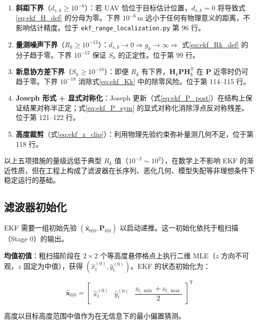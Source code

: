 \begin{enumerate}
    \item \textbf{斜距下界}（$d_{s,k} \ge 10^{-6}$）：若 UAV 恰位于目标估计位置，$d_{s,k} = 0$ 将导致式\eqref{eq:ekf_H_def} 的分母为零。下界 $10^{-6}\,\text{m}$ 远小于任何有物理意义的距离，不影响估计精度。位于 \texttt{ekf\_range\_localization.py} 第 96 行。
    \item \textbf{量测噪声下界}（$R_k \ge 10^{-12}$）：$d_{s,k} \to 0 \Rightarrow g_k \to \infty \Rightarrow$ 式\eqref{eq:ekf_Rk_def} 的分子趋于零。下界 $10^{-12}$ 保证 $S_k$ 的正定性。位于第 99 行。
    \item \textbf{新息协方差下界}（$S_k \ge 10^{-18}$）：即便 $R_k$ 有下界，$\mathbf{H}_k \mathbf{P} \mathbf{H}_k^{\mathsf{T}}$ 在 $\mathbf{P}$ 近零时仍可趋于零。下界 $10^{-18}$ 消除式\eqref{eq:ekf_Kk} 中的除零风险。位于第 114--115 行。
    \item \textbf{Joseph 形式 + 显式对称化}：Joseph 更新（式\eqref{eq:ekf_P_post}）在结构上保证结果对称半正定；式\eqref{eq:ekf_P_sym} 的显式对称化消除浮点反对称残差。位于第 121--122 行。
    \item \textbf{高度裁剪}（式\eqref{eq:ekf_z_clip}）：利用物理先验约束弥补量测几何不足，位于第 118 行。
\end{enumerate}

以上五项措施的量级远低于典型 $R_k$ 值（$10^{-2} \sim 10^2$），在数学上不影响 EKF 的渐近性质，但在工程上构成了滤波器在长序列、恶化几何、模型失配等非理想条件下稳定运行的基础。

\subsection{滤波器初始化}

EKF 需要一组初始先验 $(\hat{\mathbf{x}}_{0|0}, \mathbf{P}_{0|0})$ 以启动递推。这一初始化依托于粗扫描（Stage 0）的输出。

\textbf{均值初值}：粗扫描阶段在 $2 \times 2$ 个等高度悬停格点上执行二维 MLE（$z$ 方向不可观，$z$ 固定为中值），获得 $(\hat{x}_t^{(0)}, \hat{y}_t^{(0)})$。EKF 的状态初始化为：

\begin{equation}
\hat{\mathbf{x}}_{0|0} = \begin{bmatrix}
\hat{x}_t^{(0)} & \hat{y}_t^{(0)} & \dfrac{z_{t,\min} + z_{t,\max}}{2}
\end{bmatrix}^{\mathsf{T}}
\label{eq:ekf_init_x}
\end{equation}

高度以目标高度范围中值作为在无信息下的最小偏置猜测。

